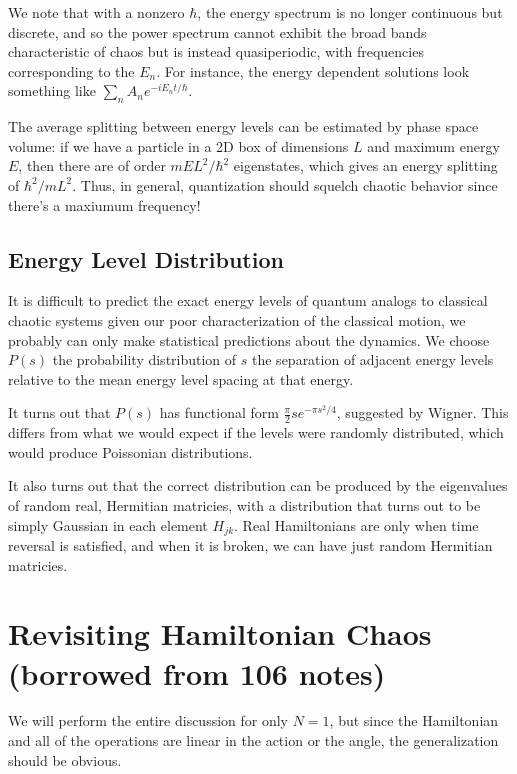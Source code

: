 \documentclass[12pt]{article}
\begin{document}
We note that with a nonzero $\hbar$, the energy spectrum is no longer continuous
but discrete, and so the power spectrum cannot exhibit the broad bands
characteristic of chaos but is instead quasiperiodic, with frequencies
corresponding to the $E_n$. For instance, the energy dependent solutions look
something like
$\sum\limits_{n}^{} A_ne^{-i E_n t/\hbar}$.

The average splitting between energy levels can be estimated by phase space
volume: if we have a particle in a 2D box of dimensions $L$ and maximum energy
$E$, then there are of order $mEL^2/\hbar^2$ eigenstates, which gives an energy
splitting of $\hbar^2/mL^2$. Thus, in general, quantization should squelch
chaotic behavior since there's a maxiumum frequency!

\subsection{Energy Level Distribution}

It is difficult to predict the exact energy levels of quantum analogs to
classical chaotic systems given our poor characterization of the classical
motion, we probably can only make statistical predictions about the dynamics. We
choose $P(s)$ the probability distribution of $s$ the separation of adjacent
energy levels relative to the mean energy level spacing at that energy.

It turns out that $P(s)$ has functional form $\frac{\pi}{2}se^{-\pi s^2/4}$,
suggested by Wigner. This differs from what we would expect if the levels were
randomly distributed, which would produce Poissonian distributions.

It also turns out that the correct distribution can be produced by the
eigenvalues of random real, Hermitian matricies, with a distribution that turns
out to be simply Gaussian in each element $H_{jk}$. Real Hamiltonians are only
when time reversal is satisfied, and when it is broken, we can have just random
Hermitian matricies.

\clearpage

\appendix

\section{Revisiting Hamiltonian Chaos (borrowed from 106 notes)}

We will perform the entire discussion for only $N=1$, but since the Hamiltonian
and all of the operations are linear in the action or the angle, the
generalization should be obvious.
\end{document}
